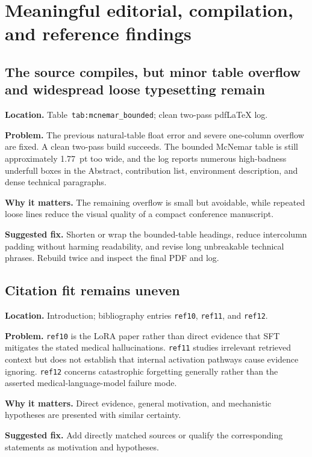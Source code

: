 \documentclass[11pt]{article}
\newcommand{\findinglabel}[1]{\textbf{#1}}
\begin{document}
\section*{Meaningful editorial, compilation, and reference findings}

\subsection*{The source compiles, but minor table overflow and widespread loose typesetting remain}

\findinglabel{Location.} Table~\texttt{tab:mcnemar\_bounded}; clean two-pass pdfLaTeX log.

\findinglabel{Problem.} The previous natural-table float error and severe one-column overflow are fixed.  A clean two-pass build succeeds.  The bounded McNemar table is still approximately 1.77~pt too wide, and the log reports numerous high-badness underfull boxes in the Abstract, contribution list, environment description, and dense technical paragraphs.

\findinglabel{Why it matters.} The remaining overflow is small but avoidable, while repeated loose lines reduce the visual quality of a compact conference manuscript.

\findinglabel{Suggested fix.} Shorten or wrap the bounded-table headings, reduce intercolumn padding without harming readability, and revise long unbreakable technical phrases.  Rebuild twice and inspect the final PDF and log.

\subsection*{Citation fit remains uneven}

\findinglabel{Location.} Introduction; bibliography entries \texttt{ref10}, \texttt{ref11}, and \texttt{ref12}.

\findinglabel{Problem.} \texttt{ref10} is the LoRA paper rather than direct evidence that SFT mitigates the stated medical hallucinations.  \texttt{ref11} studies irrelevant retrieved context but does not establish that internal activation pathways cause evidence ignoring.  \texttt{ref12} concerns catastrophic forgetting generally rather than the asserted medical-language-model failure mode.

\findinglabel{Why it matters.} Direct evidence, general motivation, and mechanistic hypotheses are presented with similar certainty.

\findinglabel{Suggested fix.} Add directly matched sources or qualify the corresponding statements as motivation and hypotheses.
\end{document}
